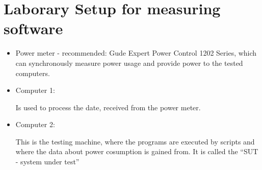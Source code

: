 \documentclass{article}
\begin{document}
\section{Laborary Setup for measuring software}

\begin{itemize}
 \item Power meter - recommended: Gude Expert Power Control 1202 Series, which can synchronously measure power usage and provide power to the tested computers.
 \item Computer 1:

    Is used to process the date, received from the power meter.
\item Computer 2:

    This is the testing machine, where the programs are executed by scripts and where the data about power cosumption is gained from. It is called the ``SUT - system under test''



\end{itemize}
\end{document}
